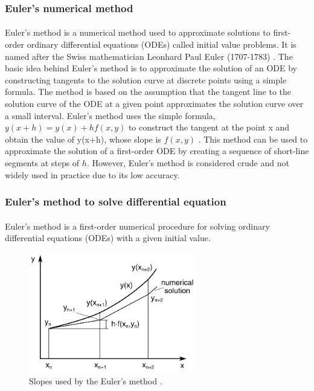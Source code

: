  \subsubsection{Euler's numerical method}
 \paragraph{}

Euler's method is a numerical method used to approximate solutions to first-order ordinary differential equations (ODEs) called initial value problems. It is named after the Swiss mathematician Leonhard Paul Euler (1707-1783) \cite{biswas2013discussion, zondervan1998review}. The basic idea behind Euler's method is to approximate the solution of an ODE by constructing tangents to the solution curve at discrete points using a simple formula. The method is based on the assumption that the tangent line to the solution curve of the ODE at a given point approximates the solution curve over a small interval. Euler's method uses the simple formula, $y(x+h) = y(x) + hf(x,y)$ to construct the tangent at the point x and obtain the value of y(x+h), whose slope is $f(x,y)$ \cite{mazandarani2013modified}. This method can be used to approximate the solution of a first-order ODE by creating a sequence of short-line segments at steps of $h$. However, Euler's method is considered crude and not widely used in practice due to its low accuracy. 

\subsubsection{Euler's method to solve differential equation}
\paragraph{}

Euler's method is a first-order numerical procedure for solving ordinary differential equations (ODEs) with a given initial value. 

 \begin{figure}[hbt!]
	\centering
	\begin{framed}
	\includegraphics[width=0.65\textwidth]{Figures/euler.PNG}
		\end{framed}
	\caption{Slopes used by the Euler's method \cite{freecodecamp.org_2021}.}
	\label{fig:6}
\end{figure}


